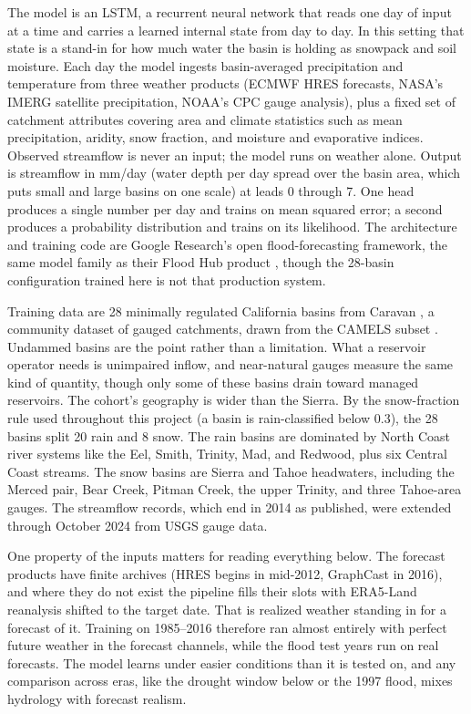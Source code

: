 \documentclass[11pt]{article}
\begin{document}
The model is an LSTM, a recurrent neural network that reads one day of input at a time and
carries a learned internal state from day to day. In this setting that state is a stand-in
for how much water the basin is holding as snowpack and soil moisture. Each day the model
ingests basin-averaged precipitation and temperature from three weather products (ECMWF
HRES forecasts, NASA's IMERG satellite precipitation, NOAA's CPC gauge analysis), plus a
fixed set of catchment attributes covering area and climate statistics such as mean
precipitation, aridity, snow fraction, and moisture and evaporative indices. Observed
streamflow is never an input; the model runs on weather alone. Output is streamflow in
mm/day (water depth per day spread over the basin area, which puts small and large basins
on one scale) at leads 0 through 7. One head produces a single number per day and trains
on mean squared error; a second produces a probability distribution and trains on its
likelihood. The architecture and training code are Google Research's open
flood-forecasting framework, the same model family as their Flood Hub product
\citep{nearing2024global}, though the 28-basin configuration trained here is not that
production system.

Training data are 28 minimally regulated California basins from Caravan
\citep{kratzert2023caravan}, a community dataset of gauged catchments, drawn from the
CAMELS subset \citep{newman2015camels}. Undammed basins are the point rather than a
limitation. What a reservoir operator needs is unimpaired inflow, and near-natural gauges
measure the same kind of quantity, though only some of these basins drain toward managed
reservoirs. The cohort's geography is wider than the Sierra. By the snow-fraction rule
used throughout this project (a basin is rain-classified below 0.3), the 28 basins split
20 rain and 8 snow. The rain basins are dominated by North Coast river systems like the
Eel, Smith, Trinity, Mad, and Redwood, plus six Central Coast streams. The snow basins are
Sierra and Tahoe headwaters, including the Merced pair, Bear Creek, Pitman Creek, the
upper Trinity, and three Tahoe-area gauges. The streamflow records, which end in 2014 as
published, were extended through October 2024 from USGS gauge data.

One property of the inputs matters for reading everything below. The forecast products
have finite archives (HRES begins in mid-2012, GraphCast in 2016), and where they do not
exist the pipeline fills their slots with ERA5-Land reanalysis shifted to the target date.
That is realized weather standing in for a forecast of it. Training on 1985--2016
therefore ran almost entirely with perfect future weather in the forecast channels, while
the flood test years run on real forecasts. The model learns under easier conditions than
it is tested on, and any comparison across eras, like the drought window below or the 1997
flood, mixes hydrology with forecast realism.
\end{document}
